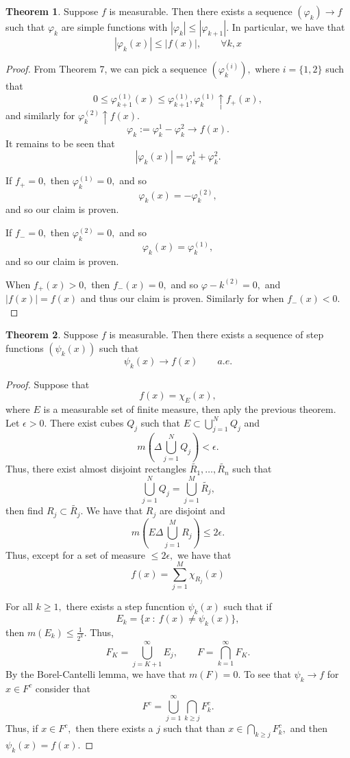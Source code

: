 \documentclass[10pt, oneside]{article}
\theoremstyle{definition}
\newtheorem{thm}{Theorem}
\begin{document}
\begin{thm}
    Suppose $f$ is measurable. Then there exists a sequence $(\varphi_k) \to f$ such that $\varphi_k$ are simple functions with $|\varphi_k| \leq |\varphi_{k+1}|.$ In particular, we have that 
    \[|\varphi_k(x)| \leq |f(x)|, \qquad \forall k, x\]
\end{thm}
\begin{proof}
    From Theorem 7, we can pick a sequence $(\varphi^{(i)}_k),$ where $i = \{1,2\}$ such that 
    \[0 \leq \varphi_{k+1}^{(1)}(x)\leq \varphi_{k+1}^{(1)}, \varphi_k^{(1)}\uparrow f_+(x),\] and similarly for $\varphi_k^{(2)}\uparrow f(x).$ 
    \[\varphi_k := \varphi_k^{1} - \varphi_k^{2} \to f(x).\] It remains to be seen that 
    \[|\varphi_k(x)| = \varphi_k^{1} + \varphi_k^{2}.\]

    If $f_+ = 0,$ then $\varphi_k^{(1)} = 0,$ and so 
    \[\varphi_k(x) = -\varphi_k^{(2)},\] and so our claim is proven.

    If $f_- = 0,$ then $\varphi_k^{(2)} = 0,$ and so 
    \[\varphi_k(x) = \varphi_k^{(1)},\] and so our claim is proven.

    When $f_+(x) >0,$ then $f_-(x) = 0,$ and so $\varphi-k^{(2)} = 0,$ and $|f(x)| = f(x)$ and thus our claim is proven. Similarly for when $f_-(x) < 0.$
\end{proof}

\begin{thm}
    Suppose $f$ is measurable. Then there exists a sequence of step functions $(\psi_k(x))$ such that 
    \[\psi_k(x) \to f(x) \qquad a.e.\]
\end{thm}
\begin{proof}
    Suppose that 
    \[f(x) = \chi_E(x),\] where $E$ is a measurable set of finite measure, then aply the previous theorem. Let $\epsilon > 0.$ There exist cubes $Q_j$ such that $E \subset \bigcup_{j=1}^N Q_j$ and 
    \[m(\Delta \bigcup_{j=1}^N Q_j)< \epsilon.\] Thus, there exist almost disjoint rectangles $\tilde{R_1}, \dots, \tilde{R_n}$ such that 
    \[\bigcup_{j=1}^N Q_j = \bigcup_{j=1}^M \tilde{R_j},\] then find $R_j \subset \tilde{R_j}.$ We have that $R_j$ are disjoint and 
    \[m(E \Delta \bigcup_{j=1}^M R_j) \leq 2\epsilon.\] Thus, except for a set of measure $\leq 2\epsilon,$ we have that 
    \[f(x) = \sum_{j=1}^M \chi_{R_j}(x)\]

    For all $k\geq 1,$ there exists a step funcntion $\psi_k(x)$ such that if 
    \[E_k = \{x \: : \: f(x) \neq \psi_k(x)\},\] then $m(E_k) \leq \frac{1}{2^k}.$ Thus, 
    \[F_K = \bigcup_{j=K+1}^\infty E_j, \qquad F = \bigcap_{k=1}^\infty F_K.\] By the Borel-Cantelli lemma, we have that $m(F) = 0.$ To see that $\psi_k \to f$ for $x\in F^c$ consider that 
    \[F^c = \bigcup_{j=1}^\infty \bigcap_{k\geq j}F^c_k.\] Thus, if $x\in F^c,$ then there exists a $j$ such that than $x\in \bigcap_{k\geq j}F_k^c,$ and then $\psi_k(x) = f(x).$
\end{proof}
\end{document}
